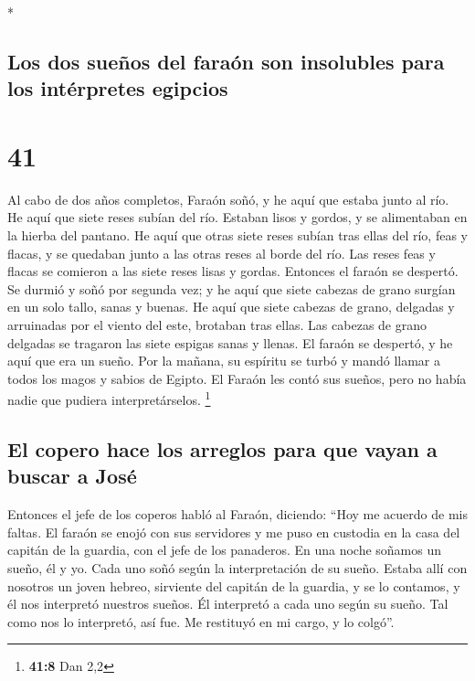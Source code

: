 \begin{paracol}{2}
\begin{otherlanguage}{english}
\end{otherlanguage}

\switchcolumn[0]*

\hypertarget{los-dos-sueuxf1os-del-farauxf3n-son-insolubles-para-los-intuxe9rpretes-egipcios}{%
\subsection{Los dos sueños del faraón son insolubles para los
intérpretes
egipcios}\label{los-dos-sueuxf1os-del-farauxf3n-son-insolubles-para-los-intuxe9rpretes-egipcios}}

\hypertarget{section-80}{%
\section{41}\label{section-80}}

 Al cabo de dos años completos, Faraón soñó, y he aquí que
estaba junto al río.  He aquí que siete reses subían del
río. Estaban lisos y gordos, y se alimentaban en la hierba del pantano.
 He aquí que otras siete reses subían tras ellas del río,
feas y flacas, y se quedaban junto a las otras reses al borde del río.
 Las reses feas y flacas se comieron a las siete reses
lisas y gordas. Entonces el faraón se despertó.  Se durmió
y soñó por segunda vez; y he aquí que siete cabezas de grano surgían en
un solo tallo, sanas y buenas.  He aquí que siete cabezas
de grano, delgadas y arruinadas por el viento del este, brotaban tras
ellas.  Las cabezas de grano delgadas se tragaron las
siete espigas sanas y llenas. El faraón se despertó, y he aquí que era
un sueño.  Por la mañana, su espíritu se turbó y mandó
llamar a todos los magos y sabios de Egipto. El Faraón les contó sus
sueños, pero no había nadie que pudiera interpretárselos. \footnote{\textbf{41:8}
  Dan 2,2}

\hypertarget{el-copero-hace-los-arreglos-para-que-vayan-a-buscar-a-josuxe9}{%
\subsection{El copero hace los arreglos para que vayan a buscar a
José}\label{el-copero-hace-los-arreglos-para-que-vayan-a-buscar-a-josuxe9}}

 Entonces el jefe de los coperos habló al Faraón,
diciendo: ``Hoy me acuerdo de mis faltas.  El faraón se
enojó con sus servidores y me puso en custodia en la casa del capitán de
la guardia, con el jefe de los panaderos.  En una noche
soñamos un sueño, él y yo. Cada uno soñó según la interpretación de su
sueño.  Estaba allí con nosotros un joven hebreo,
sirviente del capitán de la guardia, y se lo contamos, y él nos
interpretó nuestros sueños. Él interpretó a cada uno según su sueño.
 Tal como nos lo interpretó, así fue. Me restituyó en mi
cargo, y lo colgó''.


\end{paracol}
